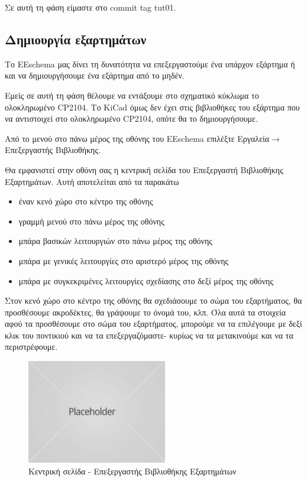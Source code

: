 \documentclass[a4paper]{article}
\begin{document}
Σε αυτή τη φάση είμαστε στο commit tag tut01.

\subsection{Δημιουργία εξαρτημάτων}
Το EEschema μας δίνει τη δυνατότητα να επεξεργαστούμε ένα υπάρχον εξάρτημα ή και να δημιουργήσουμε ένα εξάρτημα από το μηδέν.

Εμείς σε αυτή τη φάση θέλουμε να εντάξουμε στο σχηματικό κύκλωμα το ολοκληρωμένο CP2104. Το KiCad όμως δεν έχει στις βιβλιοθήκες του εξάρτημα που να αντιστοιχεί στο ολοκληρωμένο CP2104, οπότε θα το δημιουργήσουμε.

Από το μενού στο πάνω μέρος της οθόνης του EEschema επιλέξτε Εργαλεία$\rightarrow$Επεξεργαστής Βιβλιοθήκης.

Θα εμφανιστεί στην οθόνη σας η κεντρική σελίδα του Επεξεργαστή Βιβλιοθήκης Εξαρτημάτων. Αυτή αποτελείται από τα παρακάτω
\begin{itemize}
    \item έναν κενό χώρο στο κέντρο της οθόνης
    \item γραμμή μενού στο πάνω μέρος της οθόνης
    \item μπάρα βασικών λειτουργιών στο πάνω μέρος της οθόνης
    \item μπάρα με γενικές λειτουργίες στο αριστερό μέρος της οθόνης
    \item μπάρα με συγκεκριμένες λειτουργίες σχεδίασης στο δεξί μέρος της οθόνης
\end{itemize}

Στον κενό χώρο στο κέντρο της οθόνης θα σχεδιάσουμε το σώμα του εξαρτήματος, θα προσθέσουμε ακροδέκτες, θα γράψουμε το όνομά του, κλπ. Όλα αυτά τα στοιχεία αφού τα προσθέσουμε στο σώμα του εξαρτήματος, μπορούμε να τα επιλέγουμε με δεξί κλικ του ποντικιού και να τα επεξεργαζόμαστε- κυρίως να τα μετακινούμε και να τα περιστρέφουμε.

\begin{figure}
  \begin{center}
    \includegraphics{img/kicad-main.png}
    \caption{Kεντρική σελίδα - Επεξεργαστής Βιβλιοθήκης Εξαρτημάτων}
    \label{fig:kicad-main}
  \end{center}
\end{figure}
\end{document}

